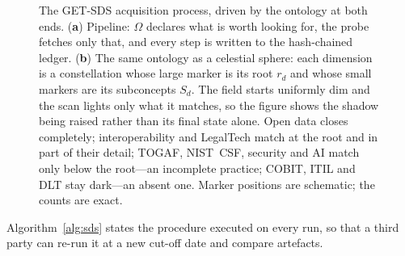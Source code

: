 \documentclass[engproc,proceedingpaper,submit,moreauthors]{Definitions/mdpi}
\begin{document}
\begin{figure}[H]
\caption{The GET-SDS acquisition process, driven by the ontology at both ends. (\textbf{a}) Pipeline: $\Omega$ declares what is worth looking for, the probe fetches only that, and every step is written to the hash-chained ledger. (\textbf{b}) The same ontology as a celestial sphere: each dimension is a constellation whose large marker is its root $r_d$ and whose small markers are its subconcepts $S_d$. The field starts uniformly dim and the scan lights only what it matches, so the figure shows the shadow being raised rather than its final state alone. Open data closes completely; interoperability and LegalTech match at the root and in part of their detail; TOGAF, NIST~CSF, security and AI match only below the root---an incomplete practice; COBIT, ITIL and DLT stay dark---an absent one. Marker positions are schematic; the counts are exact.\label{fig:getsds}}
\end{figure}

Algorithm~\ref{alg:sds} states the procedure executed on every run, so that a third party can re-run it at a new cut-off date and compare artefacts.
\end{document}

